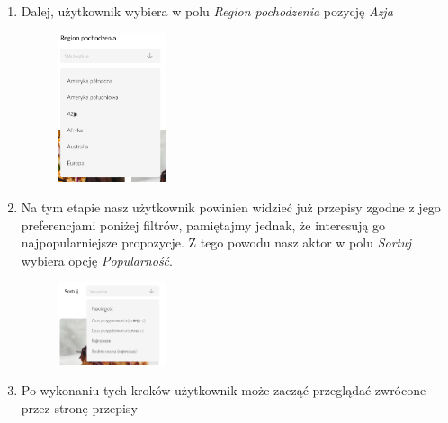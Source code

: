 \documentclass{article}
\begin{document}
\begin{enumerate}
\begin{figure}[H]
\begin{center}
            \end{center}
        \end{figure}
    \newpage    
    \item Dalej, użytkownik wybiera w polu \textit{Region pochodzenia} pozycję \textit{Azja}
        \begin{figure}[H]
            \begin{center}
                \includegraphics[width=0.3\textwidth]{images/find_recipe_step7}
            \end{center}
        \end{figure}
    \item Na tym etapie nasz użytkownik powinien widzieć już przepisy zgodne z jego preferencjami poniżej filtrów, pamiętajmy jednak, że interesują go najpopularniejsze propozycje.
        Z tego powodu nasz aktor w polu \textit{Sortuj} wybiera opcję \textit{Popularność}.
        \begin{figure}[H]
            \begin{center}
                \includegraphics[width=0.3\textwidth]{images/find_recipe_step8}
            \end{center}
        \end{figure}
    \item Po wykonaniu tych kroków użytkownik może zacząć przeglądać zwrócone przez stronę przepisy
\end{enumerate}

\newpage
\end{document}
